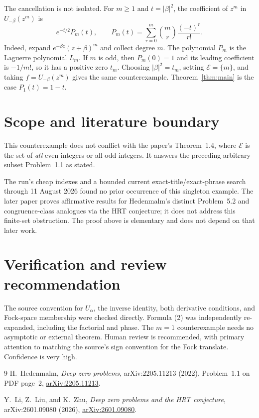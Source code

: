 \documentclass[11pt]{article}
\begin{document}
The cancellation is not isolated.  For $m\ge1$ and $t=|\beta|^2$, the
coefficient of $z^m$ in $U_{-\beta}(z^m)$ is
\begin{equation}
 e^{-t/2}P_m(t),
 \qquad
 P_m(t)=\sum_{r=0}^{m}\binom mr\frac{(-t)^r}{r!}.                   \tag{2}
\end{equation}
Indeed, expand
$e^{-\bar\beta z}(z+\beta)^m$ and collect degree $m$.  The polynomial
$P_m$ is the Laguerre polynomial $L_m$.  If $m$ is odd, then
$P_m(0)=1$ and its leading coefficient is $-1/m!$, so it has a positive
zero $t_m$.  Choosing $|\beta|^2=t_m$, setting
$\mathcal E=\{m\}$, and taking $f=U_{-\beta}(z^m)$ gives the same
counterexample.  Theorem~\ref{thm:main} is the case
$P_1(t)=1-t$.

\section*{Scope and literature boundary}

This counterexample does not conflict with the paper's Theorem~1.4, where
$\mathcal E$ is the set of \emph{all} even integers or all odd integers.
It answers the preceding arbitrary-subset Problem~1.1 as stated.

The run's cheap indexes and a bounded current exact-title/exact-phrase search
through 11 August 2026 found no prior occurrence of this singleton example.
The later paper \cite{LLZ} proves affirmative results for Hedenmalm's distinct
Problem~5.2 and congruence-class analogues via the HRT conjecture; it does not
address this finite-set obstruction.  The proof above is elementary and does
not depend on that later work.

\section*{Verification and review recommendation}

The source convention for $U_\alpha$, the inverse identity, both derivative
conditions, and Fock-space membership were checked directly.  Formula (2)
was independently re-expanded, including the factorial and phase.  The
$m=1$ counterexample needs no asymptotic or external theorem.  Human review is
recommended, with primary attention to matching the source's sign convention
for the Fock translate.  Confidence is very high.

\small
\begin{thebibliography}{9}
H.~Hedenmalm,
\emph{Deep zero problems}, arXiv:2205.11213 (2022), Problem~1.1 on PDF
page~2, \href{https://arxiv.org/abs/2205.11213}{arXiv:2205.11213}.

Y.~Li, Z.~Liu, and K.~Zhu,
\emph{Deep zero problems and the HRT conjecture}, arXiv:2601.09080 (2026),
\href{https://arxiv.org/abs/2601.09080}{arXiv:2601.09080}.
\end{thebibliography}
\end{document}

